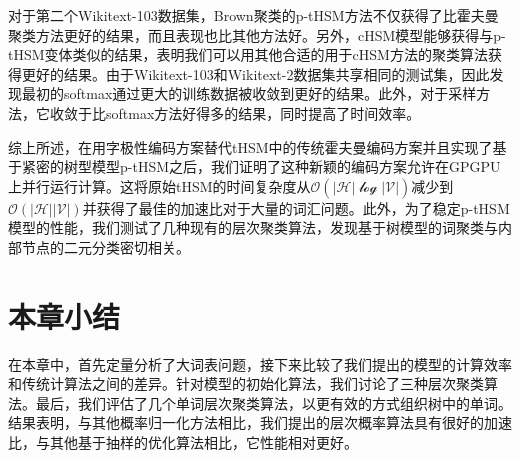 对于第二个Wikitext-103数据集，Brown聚类的p-tHSM方法不仅获得了比霍夫曼聚类方法更好的结果，而且表现也比其他方法好。另外，cHSM模型能够获得与p-tHSM变体类似的结果，表明我们可以用其他合适的用于cHSM方法的聚类算法获得更好的结果。由于Wikitext-103和Wikitext-2数据集共享相同的测试集，因此发现最初的softmax通过更大的训练数据被收敛到更好的结果。此外，对于采样方法，它收敛于比softmax方法好得多的结果，同时提高了时间效率。

综上所述，在用字极性编码方案替代tHSM中的传统霍夫曼编码方案并且实现了基于紧密的树型模型p-tHSM之后，我们证明了这种新颖的编码方案允许在GPGPU上并行运行计算。这将原始tHSM的时间复杂度从$ \mathcal {O(| H | \log | V |)} $减少到$\mathcal{O(| H || V |)} $并获得了最佳的加速比对于大量的词汇问题。此外，为了稳定p-tHSM模型的性能，我们测试了几种现有的层次聚类算法，发现基于树模型的词聚类与内部节点的二元分类密切相关。

\section{本章小结}

在本章中，首先定量分析了大词表问题，接下来比较了我们提出的模型的计算效率和传统计算法之间的差异。针对模型的初始化算法，我们讨论了三种层次聚类算法。最后，我们评估了几个单词层次聚类算法，以更有效的方式组织树中的单词。结果表明，与其他概率归一化方法相比，我们提出的层次概率算法具有很好的加速比，与其他基于抽样的优化算法相比，它性能相对更好。

